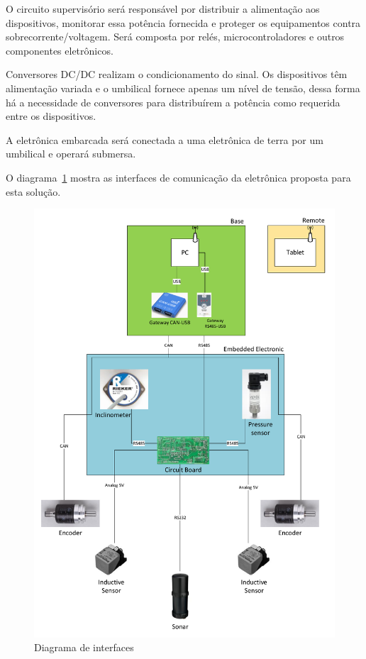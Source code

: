 O circuito supervisório será responsável por distribuir a alimentação aos
dispositivos, monitorar essa potência fornecida e proteger os equipamentos
contra sobrecorrente/voltagem. Será composta por relés, microcontroladores e
outros componentes eletrônicos.

Conversores DC/DC realizam o condicionamento do sinal. Os dispositivos têm
alimentação variada e o umbilical fornece apenas um nível de tensão, dessa forma
há a necessidade de conversores para distribuírem a potência como requerida
entre os dispositivos.

A eletrônica embarcada será conectada a uma eletrônica de terra por um umbilical e operará submersa. 

O diagrama~\ref{EE_1} mostra as interfaces de comunicação da eletrônica proposta
para esta solução.

\begin{figure}[H]
    \centering
    \includegraphics[width=1\columnwidth]{figs/EE/1.pdf}
    \caption{Diagrama de interfaces}
    \label{EE_1}
\end{figure}

